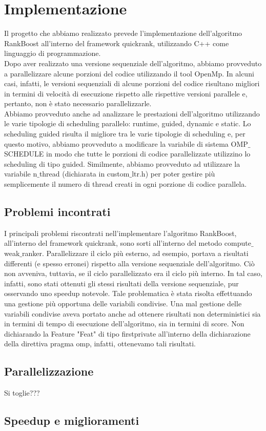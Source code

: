 \chapter*{Implementazione}

Il progetto che abbiamo realizzato prevede l'implementazione dell'algoritmo RankBoost all'interno del framework quickrank, utilizzando C++ come linguaggio di programmazione.\\
Dopo aver realizzato una versione sequenziale dell'algoritmo, abbiamo provveduto a parallelizzare alcune porzioni del codice utilizzando il tool OpenMp. In alcuni casi, infatti, le versioni sequenziali di alcune porzioni del codice risultano migliori in termini di velocità di esecuzione rispetto alle rispettive versioni parallele e, pertanto, non è stato necessario parallelizzarle.\\ Abbiamo provveduto anche ad analizzare le prestazioni dell'algoritmo utilizzando le varie tipologie di scheduling parallelo: runtime, guided, dynamic e static. Lo scheduling guided risulta il migliore tra le varie tipologie di scheduling e, per questo motivo, abbiamo provveduto a modificare la variabile di sistema OMP$\_$SCHEDULE in modo che tutte le porzioni di codice parallelizzate utilizzino lo scheduling di tipo guided. Similmente, abbiamo provveduto ad utilizzare la variabile n$\_$thread (dichiarata in custom$\_$ltr.h) per poter gestire più semplicemente il numero di thread creati in ogni porzione di codice parallela.

	\section*{Problemi incontrati}

		I principali problemi riscontrati nell'implementare l'algoritmo RankBoost, all'interno del framework quickrank, sono sorti all'interno del metodo compute$\_$weak$\_$ranker. Parallelizzare il ciclo più esterno, ad esempio, portava a risultati differenti (e spesso erronei) rispetto alla versione sequenziale dell'algoritmo. Ciò non avveniva, tuttavia, se il ciclo parallelizzato era il ciclo più interno. In tal caso, infatti, sono stati ottenuti gli stessi risultati della versione sequenziale, pur osservando uno speedup notevole. Tale problematica è stata risolta effettuando una gestione più opportuna delle variabili condivise. Una mal gestione delle variabili condivise aveva portato anche ad ottenere risultati non deterministici sia in termini di tempo di esecuzione dell'algoritmo, sia in termini di score. Non dichiarando la Feature "Feat" di tipo firstprivate all'interno della dichiarazione della direttiva pragma omp, infatti, ottenevamo tali risultati.
	
	\section*{Parallelizzazione}

	Si toglie???	
	
	\section*{Speedup e miglioramenti}
